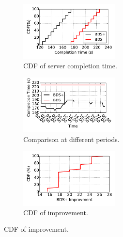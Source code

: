 \begin{figure}[t]
        \centering
        \begin{subfigure}[b]{0.3\textwidth}
                \centering
                \includegraphics[width=50mm]{images/cdf_of_machine_completion_time.pdf}
                \caption{CDF of server completion time.}
                \label{fig:bdsplus:server}
        \end{subfigure}
        \begin{subfigure}[b]{0.3\textwidth}
                \centering
                \includegraphics[width=50mm]{images/completion_time_period.pdf}
                \caption{Comparison at different periods.}
                \label{fig:bdsplus:periods}
        \end{subfigure}
        \begin{subfigure}[b]{0.3\textwidth}
                \centering
                \includegraphics[width=50mm]{images/improvement_vs_bds.pdf}
                \caption{CDF of improvement.}
                \label{fig:bdsplus:vs}
        \end{subfigure}
        \label{fig:bdsplus}
\end{figure}

